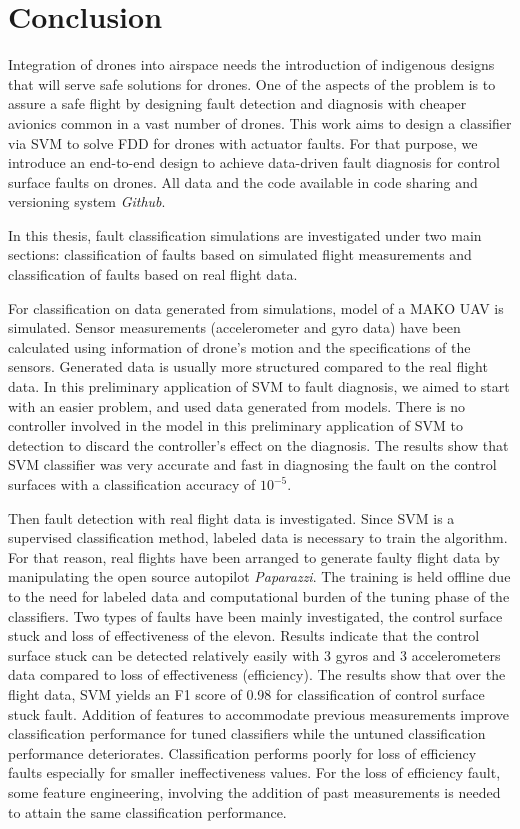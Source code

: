\chapter{Conclusion}

Integration of drones into airspace needs the introduction of indigenous designs that will serve safe solutions for drones. One of the aspects of the problem is to assure a safe flight by designing fault detection and diagnosis with cheaper avionics common in a vast number of drones.
This work aims to design a classifier via SVM to solve FDD for drones with actuator faults.
For that purpose, we introduce an end-to-end design to achieve data-driven fault diagnosis for control surface faults on drones. All data and the code available in code sharing and versioning system \emph{Github}. 

In this thesis, fault classification simulations are investigated under two main sections: classification of faults based on simulated flight measurements and classification of faults based on real flight data. 

For classification on data generated from simulations, model of a MAKO UAV is simulated.
Sensor measurements (accelerometer and gyro data) have been calculated using information of drone's motion and the specifications of the sensors. 
Generated data is usually more structured compared to the real flight data. 
In this preliminary application of SVM to fault diagnosis, we aimed to start with an easier problem, and used data generated from models.
There is no controller involved in the model in this preliminary application of SVM to detection to discard the controller's effect on the diagnosis. 
The results show that SVM classifier was very accurate and fast in diagnosing the fault on the control surfaces with a classification accuracy of $10^{-5}$.

Then fault detection with real flight data is investigated. 
Since SVM is a supervised classification method, labeled data is necessary to train the algorithm. For that reason, real flights have been arranged to generate faulty flight data by manipulating the open source autopilot \emph{Paparazzi}.  
The training is held offline due to the need for labeled data and computational burden of the tuning phase of the classifiers. 
Two types of faults have been mainly investigated, the control surface stuck and loss of effectiveness of the elevon. Results indicate that the control surface stuck can be detected relatively easily with 3 gyros and 3 accelerometers data compared to loss of effectiveness (efficiency). 
The results show that over the flight data, SVM yields an F1 score of 0.98 for classification of control surface stuck fault. 
Addition of features to accommodate previous measurements improve classification performance for tuned classifiers while the untuned classification performance deteriorates. 
Classification performs poorly for loss of efficiency faults especially for smaller ineffectiveness values. 
For the loss of efficiency fault, some feature engineering, involving the addition of past measurements is needed to attain the same classification performance.

